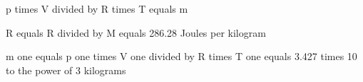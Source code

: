 p times V divided by R times T equals m

R equals R divided by M equals 286.28 Joules per kilogram

m one equals p one times V one divided by R times T one equals 3.427 times 10 to the power of 3 kilograms